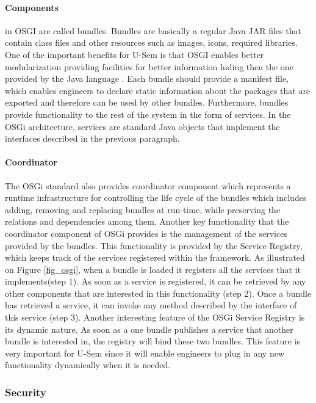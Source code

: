 \paragraph{Components}
  in OSGI are called bundles. Bundles are basically a regular Java JAR files that contain class files and other resources such as images, icons, required libraries. One of the important benefits for U-Sem is that OSGI enables better modularization providing facilities for better information hiding then the one provided by the Java language \cite{tavares2008gentle}. Each bundle should provide a manifest file, which enables engineers to declare static information about the packages that are exported and therefore can be used by other bundles. Furthermore, bundles provide functionality to the rest of the system in the form of services. In the OSGi architecture, services are standard Java objects that implement the interfaces described in the previous paragraph.

\paragraph{Coordinator}
The OSGi standard also provides coordinator component which represents a runtime infrastructure for controlling the life cycle of the bundles which includes adding, removing and replacing bundles at run-time, while preserving the relations and dependencies among them. Another key functionality that the coordinator component of OSGi provides is the management of the services provided by the bundles. This functionality is provided by the Service Registry, which keeps track of the services registered within the framework. As illustrated on Figure \ref{fig_osgi}, when a bundle is loaded it registers all the services that it implements(step 1). As soon as a service is registered, it can be retrieved by any other components that are interested in this functionality (step 2). Once a bundle has retrieved a service, it can invoke any method described by the interface of this service (step 3). Another interesting feature of the OSGi Service Registry is its dynamic nature. As soon as a one bundle publishes a service that another bundle is interested in, the registry will bind these two bundles. This feature is very important for U-Sem since it will enable engineers to plug in any new functionality dynamically when it is needed.

\subsubsection{Security}

